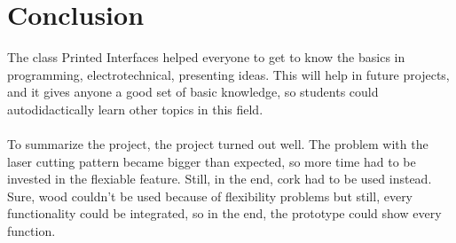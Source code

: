 \documentclass[00_doc.tex]{subfiles}
\begin{document}
    \section{Conclusion}
    \begin{flushleft}
        The class Printed Interfaces helped everyone to get to know the basics in programming,
        electrotechnical, presenting ideas. This will help in future projects, and it gives 
        anyone a good set of basic knowledge, so students could autodidactically learn other 
        topics in this field.\\~\\

        To summarize the project, the project turned out well. The problem with the laser 
        cutting pattern became bigger than expected, so more time had to be invested in the 
        flexiable feature. Still, in the end, cork had to be used instead. Sure, wood couldn't 
        be used because of flexibility problems but still, every functionality could be 
        integrated, so in the end, the prototype could show every function.
    \end{flushleft}
\end{document}
